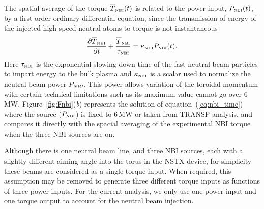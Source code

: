 \documentclass[12pt]{iopart}
\begin{document}
The spatial average of the torque $\overline{T}_\textrm{\tiny{NBI}}(t)$ is related to the power input, $P_\textrm{\tiny{NBI}}(t)$, by a first order ordinary-differential equation, since the transmission of energy of the injected high-speed neutral atoms to torque is not instantaneous
\begin{equation}
   \frac{\partial \overline{T}_\textrm{\tiny{NBI}}}{\partial t}
   + \frac{\overline{T}_\textrm{\tiny{NBI}}}{\tau_\textrm{\tiny{NBI}}}  = \kappa_\textrm{\tiny{NBI}} P_\textrm{\tiny{NBI}}(t).
   \label{eq:nbi_time}
\end{equation}
Here $\tau_\textrm{\tiny{NBI}}$ is the exponential slowing down time of the fast neutral beam particles to impart energy to the bulk plasma and $\kappa_\textrm{\tiny{NBI}}$ is a scalar used to normalize the neutral beam power $P_{NBI}$.  
This  power allows variation of the toroidal momentum with certain  technical limitations such as its maximum value cannot go over 6\,MW.
Figure~\ref{fig:Fnbi}(\emph{b}) represents the solution of equation~(\ref{eq:nbi_time}) where the source ($P_\textrm{\tiny{NBI}}$) is fixed to 6\,MW or taken from TRANSP analysis, and compares it directly with the spacial averaging of the experimental NBI torque when the three NBI sources are on.

Although there is one neutral beam line, and three NBI sources, each with a slightly different aiming angle into the torus in the NSTX device, for simplicity these beams are considered as a single torque input.  When required, this assumption may be removed to generate three different torque inputs as functions of three power inputs.  For the current analysis, we only use one power input and one torque output to account for the neutral beam injection.
\end{document}
